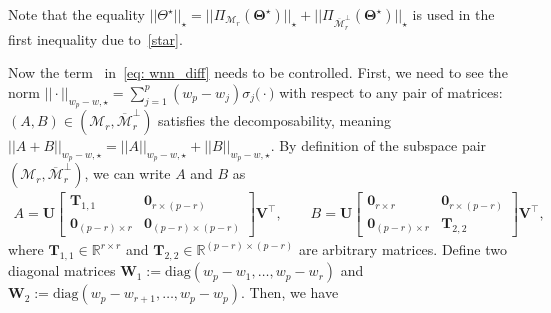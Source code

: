 \documentclass[alpha-refs]{wiley-article}
\newcommand{\RN}[1]{ \textup{\uppercase\expandafter{\romannumeral#1}} }
\begin{document}
Note that the equality $||\Theta^\star||_{\star}=||\Pi_{\mathcal{M}_{r}}(\boldsymbol{\Theta^{\star}})||_{\star} + ||\Pi_{\overline{\mathcal{M}}_{r}^{\perp}}(\boldsymbol{\Theta^{\star}})||_{\star}$ is used in the first inequality due to~\eqref{star}.

Now the term~\RN{2} in~\eqref{eq: wnn_diff} needs to be controlled.
First, we need to see the norm $ ||\cdot||_{w_{p} - w, \star} = \sum^{p}_{j = 1} (w_{p}-w_{j}) \sigma_{j}\big(\cdot\big)$ with respect to any pair of matrices: $(A,B)\in(\mathcal{M}_{r},\overline{\mathcal{M}}_{r}^{\perp})$ satisfies the decomposability, meaning $
||A+B||_{w_{p} - w, \star}=||A||_{w_{p} - w, \star}+||B||_{w_{p} - w, \star}$.
By definition of the subspace pair $(\mathcal{M}_{r},\overline{\mathcal{M}}_{r}^{\perp})$, we can write $A$ and $B$ as
\begin{align*}
    A = \boldsymbol{U}
    \begin{bmatrix}
        \boldsymbol{T}_{1,1} & \boldsymbol{0}_{r\times (p-r)} \\
        \boldsymbol{0}_{(p-r) \times r} & \boldsymbol{0}_{(p-r) \times (p-r)}
    \end{bmatrix}
    \boldsymbol{V}^{\top}, \qquad
    B = \boldsymbol{U}
    \begin{bmatrix}
        \boldsymbol{0}_{r \times r} & \boldsymbol{0}_{r\times (p-r)} \\
        \boldsymbol{0}_{(p-r) \times r} & \boldsymbol{T}_{2,2}
    \end{bmatrix}
    \boldsymbol{V}^{\top},
\end{align*}
where $\boldsymbol{T}_{1,1}\in\mathbb{R}^{r \times r}$ and $\boldsymbol{T}_{2,2}\in\mathbb{R}^{(p-r) \times (p-r)}$ are arbitrary matrices.
Define two diagonal matrices $\boldsymbol{W}_{1}:=\text{diag}(w_{p}-w_{1},\dots,w_{p}-w_{r})$ and $\boldsymbol{W}_{2}:=\text{diag}(w_{p}-w_{r+1},\dots,w_{p}-w_{p})$.
Then, we have
\end{document}
